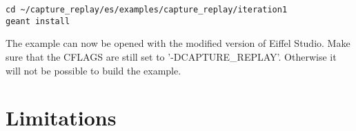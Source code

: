 \begin{lstlisting}
cd ~/capture_replay/es/examples/capture_replay/iteration1
geant install
\end{lstlisting}

The example can now be opened with the modified version of Eiffel Studio. Make sure that the CFLAGS are still set to '-DCAPTURE\_REPLAY'. Otherwise it will not be possible to build the example.



\section {Limitations}
